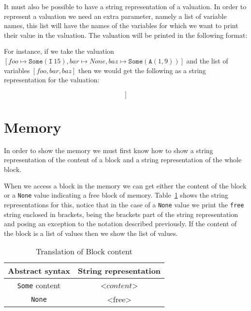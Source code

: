 It must also be possible to have a string representation of a valuation.
In order to represent a valuation we need an extra parameter, namely a list of variable names, this list will have the names of the variables for which we want to print their value in the valuation.
The valuation will be printed in the following format:
\begin{equation*}
[<vname_0> = <value_0>, <vname_1> = <value_1>, \dots, <vname_n> = <value_n>]
\end{equation*}

For instance, if we take the valuation $[foo \mapsto \mathtt{Some}(\mathtt{I}\ 15), bar \mapsto None, baz \mapsto \mathtt{Some}(\mathtt{A}(1,9))]$ and the list of variables $[foo, bar, baz]$ then we would get the following as a string representation for the valuation:

\begin{equation*}
[foo\ =\ 15,\ bar\ =\ ?,\ baz\ =\ 1[9]]
\end{equation*}


\section{Memory}\label{section:pretty_memory}

In order to show the memory we must first know how to show a string representation of the content of a block and a string representation of the whole block.

When we access a block in the memory we can get either the content of the block or a \verb|None| value indicating a free block of memory.
Table~\ref{tab:pretty_block_content} shows the string representations for this, notice that in the case of a \verb|None| value we print the \verb|free| string enclosed in brackets, being the brackets part of the string representation and posing an exception to the notation described previously.
If the content of the block is a list of values then we show the list of values.

\begin{table}[h!]
\centering
\begin{tabular}{|c|c|}
  \hline
  \textbf{Abstract syntax} & \textbf{String representation} \\ [0.5ex]
  \hline \hline
  \verb|Some| content & <$content$> \\
  \verb|None| & <free> \\
  \hline
\end{tabular}

\caption{Translation of Block content}
\label{tab:pretty_block_content}
\end{table}

